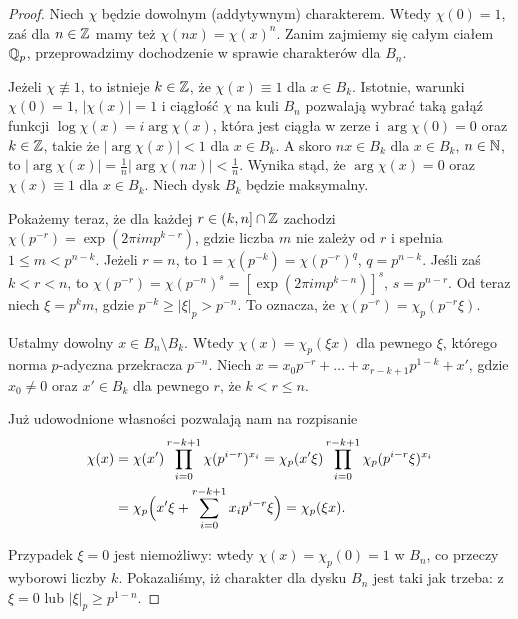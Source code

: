 \begin{proof}
	Niech $\chi$ będzie dowolnym (addytywnym) charakterem. 
	Wtedy $\chi(0) = 1$, zaś dla $n \in \mathbb Z$ mamy też $\chi(nx) = \chi(x)^n$.
	Zanim zajmiemy się całym ciałem $\mathbb Q_p$, przeprowadzimy dochodzenie w sprawie charakterów dla $B_n$.

	Jeżeli $\chi \not \equiv 1$, to istnieje $k \in \mathbb Z$, że $\chi(x) \equiv 1$ dla $x \in B_k$.
	Istotnie, warunki $\chi(0) = 1$, $|\chi(x)| = 1$ i ciągłość $\chi$ na kuli $B_n$ pozwalają wybrać taką gałąź funkcji $\log \chi(x) = i \arg \chi (x)$, która jest ciągła w zerze i $\arg \chi(0) = 0$ oraz $k \in \mathbb Z$, takie że $|\arg \chi(x)| < 1$ dla $x \in B_k$.
	A skoro $nx \in B_k$ dla $x \in B_k$, $n \in \mathbb N$, to $|\arg \chi (x)| = \frac 1n|\arg \chi (nx)|< \frac 1n$.
	Wynika stąd, że $\arg \chi (x) = 0$ oraz $\chi (x) \equiv 1$ dla $x \in B_k$.
	Niech dysk $B_k$ będzie maksymalny.

	Pokażemy teraz, że dla każdej $r \in (k, n] \cap \mathbb Z$ zachodzi $\chi(p^{-r}) = \exp (2\pi i m p^{k - r})$, gdzie liczba $m$ nie zależy od $r$ i spełnia $1 \le m < p^{n-k}$.
	Jeżeli $r = n$, to $1 = \chi(p^{-k}) = \chi(p^{-r})^q$, $q = p^{n - k}$.
	Jeśli zaś $k < r < n$, to $\chi(p^{-r}) = \chi(p^{-n})^s = [\exp (2 \pi i m p^{k-n})]^s$, $s = p^{n-r}$.
	Od teraz niech $\xi = p^k m$, gdzie $p^{-k} \ge |\xi|_p > p^{-n}$.
	To oznacza, że $\chi(p^{-r}) = \chi_p(p^{-r}\xi)$.

	Ustalmy dowolny $x \in B_n \setminus B_k$.
	Wtedy $\chi(x) = \chi_p(\xi x)$ dla pewnego $\xi$, którego norma $p$-adyczna przekracza $p^{-n}$.
	Niech $x = x_0p^{-r} + \ldots + x_{r - k +1} p^{1-k} + x'$, gdzie $x_0 \neq 0$ oraz $x' \in B_k$ dla pewnego $r$, że $k < r \le n$.

	Już udowodnione własności pozwalają nam na rozpisanie
	\begin{align*}
		\chi(x) & = \chi(x') \prod_{i=0}^{r-k+1} \chi(p^{i-r})^{x_i}   = \chi_p(x' \xi) \prod_{i = 0}^{r-k +1} \chi_p(p^{i-r} \xi)^{x_i} \\
		& = \chi_p\Bigl(x' \xi + \sum_{i=0}^{r-k+1} x_ip^{i-r} \xi\Bigr) = \chi_p(\xi x).
	\end{align*}

	Przypadek $\xi = 0$ jest niemożliwy: wtedy $\chi(x) = \chi_p(0) = 1$ w $B_n$, co przeczy wyborowi liczby $k$.
	Pokazaliśmy, iż charakter dla dysku $B_n$ jest taki jak trzeba: z $\xi = 0$ lub $|\xi|_p \ge p^{1-n}$.


\end{proof}
